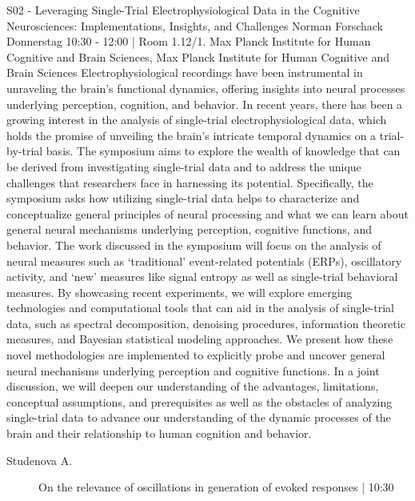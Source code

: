
            \begin{symposium}
            {S02 - Leveraging Single-Trial Electrophysiological Data in the Cognitive Neurosciences: Implementations, Insights, and Challenges}
            {Norman Forschack}
            {Donnerstag 10:30 - 12:00 | Room 1.12/1.}
            {Max Planck Institute for Human Cognitive and Brain Sciences, Max Planck Institute for Human Cognitive and Brain Sciences}
            Electrophysiological recordings have been instrumental in unraveling the brain's functional dynamics, offering insights into neural processes underlying perception, cognition, and behavior. In recent years, there has been a growing interest in the analysis of single-trial electrophysiological data, which holds the promise of unveiling the brain's intricate temporal dynamics on a trial-by-trial basis. The symposium aims to explore the wealth of knowledge that can be derived from investigating single-trial data and to address the unique challenges that researchers face in harnessing its potential.
Specifically, the symposium asks how utilizing single-trial data helps to characterize and conceptualize general principles of neural processing and what we can learn about general neural mechanisms underlying perception, cognitive functions, and behavior. The work discussed in the symposium will focus on the analysis of neural measures such as ‘traditional’ event-related potentials (ERPs), oscillatory activity, and ‘new’ measures like signal entropy as well as single-trial behavioral measures. By showcasing recent experiments, we will explore emerging technologies and computational tools that can aid in the analysis of single-trial data, such as spectral decomposition, denoising procedures, information theoretic measures, and Bayesian statistical modeling approaches. We present how these novel methodologies are implemented to explicitly probe and uncover general neural mechanisms underlying perception and cognitive functions. In a joint discussion, we will deepen our understanding of the advantages, limitations, conceptual assumptions, and prerequisites as well as the obstacles of analyzing single-trial data to advance our understanding of the dynamic processes of the brain and their relationship to human cognition and behavior.
            \begin{description}    
            
                \item [ Studenova A.] On the relevance of oscillations in generation of evoked responses \textcolor{mygray}{ | 10:30}    
                

\end{description}
\end{symposium}
